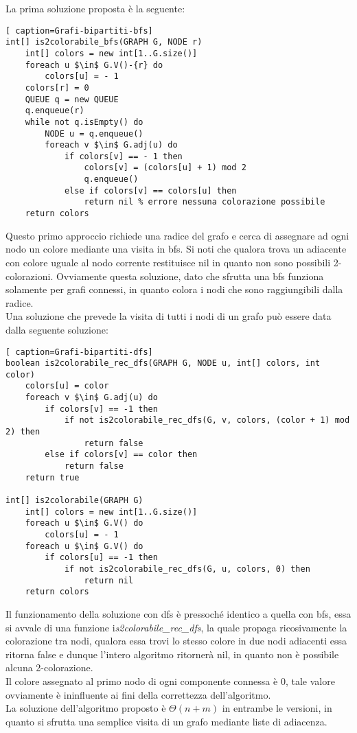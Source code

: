 \documentclass[../cheatSheetAlgoritmi.tex]{subfiles}
\begin{document}
La prima soluzione proposta è la seguente:
\begin{lstlisting}[ caption=Grafi-bipartiti-bfs]
int[] is2colorabile_bfs(GRAPH G, NODE r)
	int[] colors = new int[1..G.size()]
  	foreach u $\in$ G.V()-{r} do
    	colors[u] = - 1
  	colors[r] = 0
  	QUEUE q = new QUEUE
  	q.enqueue(r)
  	while not q.isEmpty() do
    	NODE u = q.enqueue()
    	foreach v $\in$ G.adj(u) do
      		if colors[v] == - 1 then
        		colors[v] = (colors[u] + 1) mod 2
        		q.enqueue()
      		else if colors[v] == colors[u] then
        		return nil % errore nessuna colorazione possibile
  	return colors
\end{lstlisting}
Questo primo approccio richiede una radice del grafo e cerca di assegnare ad ogni nodo un colore mediante una visita in bfs. Si noti che qualora trova un adiacente con colore uguale al nodo corrente restituisce nil in quanto non sono possibili 2-colorazioni. Ovviamente questa soluzione, dato che sfrutta una bfs funziona solamente per grafi connessi, in quanto colora i nodi che sono raggiungibili dalla radice.\\
Una soluzione che prevede la visita di tutti i nodi di un grafo può essere data dalla seguente soluzione:
\newpage
\begin{lstlisting}[ caption=Grafi-bipartiti-dfs]
boolean is2colorabile_rec_dfs(GRAPH G, NODE u, int[] colors, int color)
	colors[u] = color
  	foreach v $\in$ G.adj(u) do
    	if colors[v] == -1 then
      		if not is2colorabile_rec_dfs(G, v, colors, (color + 1) mod 2) then
        		return false
    	else if colors[v] == color then
      		return false
  	return true

int[] is2colorabile(GRAPH G)
 	int[] colors = new int[1..G.size()]
  	foreach u $\in$ G.V() do
    	colors[u] = - 1
  	foreach u $\in$ G.V() do
    	if colors[u] == -1 then 
      		if not is2colorabile_rec_dfs(G, u, colors, 0) then
        		return nil
  	return colors
\end{lstlisting}
Il funzionamento della soluzione con dfs è pressoché identico a quella con bfs, essa si avvale di una funzione i\textit{s2colorabile\_rec\_dfs}, la quale propaga ricosivamente la colorazione tra nodi, qualora essa trovi lo stesso colore in due nodi adiacenti essa ritorna false e dunque l'intero algoritmo ritornerà nil, in quanto non è possibile alcuna 2-colorazione. \\ Il colore assegnato al primo nodo di ogni componente connessa è 0, tale valore ovviamente è ininfluente ai fini della correttezza dell'algoritmo. \\
La soluzione dell'algoritmo proposto è $\Theta(n + m)$ in entrambe le versioni, in quanto si sfrutta una semplice visita di un grafo mediante liste di adiacenza. 
\end{document}

